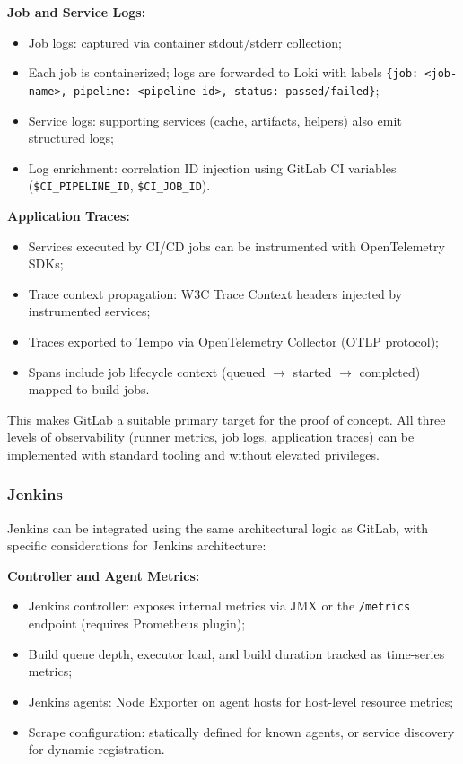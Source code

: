 \textbf{Job and Service Logs:}
\begin{itemize}
    \item Job logs: captured via container stdout/stderr collection;
    \item Each job is containerized; logs are forwarded to Loki with labels \texttt{\{job: <job-name>, pipeline: <pipeline-id>, status: passed/failed\}};
    \item Service logs: supporting services (cache, artifacts, helpers) also emit structured logs;
    \item Log enrichment: correlation ID injection using GitLab CI variables (\texttt{\$CI\_PIPELINE\_ID}, \texttt{\$CI\_JOB\_ID}).
\end{itemize}

\textbf{Application Traces:}
\begin{itemize}
    \item Services executed by CI/CD jobs can be instrumented with OpenTelemetry SDKs;
    \item Trace context propagation: W3C Trace Context headers injected by instrumented services;
    \item Traces exported to Tempo via OpenTelemetry Collector (OTLP protocol);
    \item Spans include job lifecycle context (queued $\rightarrow$ started $\rightarrow$ completed) mapped to build jobs.
\end{itemize}

This makes GitLab a suitable primary target for the proof of concept. All three levels of observability (runner metrics, job logs, application traces) can be implemented with standard tooling and without elevated privileges.

\subsubsection{Jenkins}
\label{subsubsec:jenkins_integration}

Jenkins can be integrated using the same architectural logic as GitLab, with specific considerations for Jenkins architecture:

\textbf{Controller and Agent Metrics:}
\begin{itemize}
    \item Jenkins controller: exposes internal metrics via JMX or the \texttt{/metrics} endpoint (requires Prometheus plugin);
    \item Build queue depth, executor load, and build duration tracked as time-series metrics;
    \item Jenkins agents: Node Exporter on agent hosts for host-level resource metrics;
    \item Scrape configuration: statically defined for known agents, or service discovery for dynamic registration.
\end{itemize}

